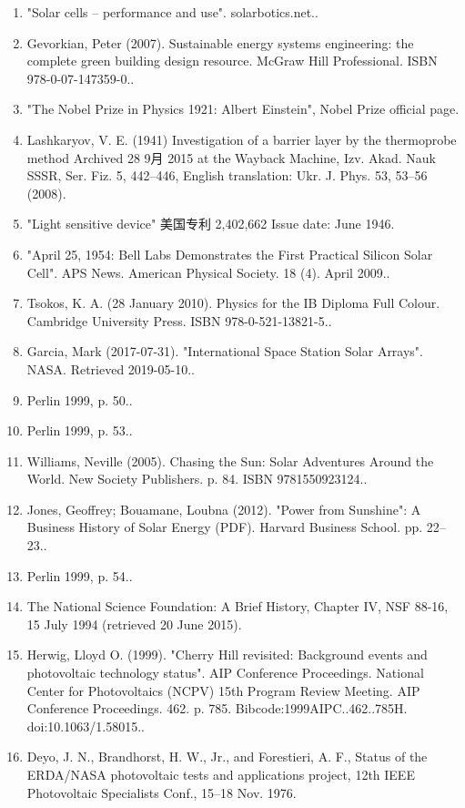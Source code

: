 \begin{enumerate}
\item "Solar cells – performance and use". solarbotics.net..
\item Gevorkian, Peter (2007). Sustainable energy systems engineering: the complete green building design resource. McGraw Hill Professional. ISBN 978-0-07-147359-0..
\item "The Nobel Prize in Physics 1921: Albert Einstein", Nobel Prize official page.
\item Lashkaryov, V. E. (1941) Investigation of a barrier layer by the thermoprobe method Archived 28 9月 2015 at the Wayback Machine, Izv. Akad. Nauk SSSR, Ser. Fiz. 5, 442–446, English translation: Ukr. J. Phys. 53, 53–56 (2008).
\item "Light sensitive device" 美国专利 2,402,662 Issue date: June 1946.
\item "April 25, 1954: Bell Labs Demonstrates the First Practical Silicon Solar Cell". APS News. American Physical Society. 18 (4). April 2009..
\item Tsokos, K. A. (28 January 2010). Physics for the IB Diploma Full Colour. Cambridge University Press. ISBN 978-0-521-13821-5..
\item Garcia, Mark (2017-07-31). "International Space Station Solar Arrays". NASA. Retrieved 2019-05-10..
\item Perlin 1999, p. 50..
\item Perlin 1999, p. 53..
\item Williams, Neville (2005). Chasing the Sun: Solar Adventures Around the World. New Society Publishers. p. 84. ISBN 9781550923124..
\item Jones, Geoffrey; Bouamane, Loubna (2012). "Power from Sunshine": A Business History of Solar Energy (PDF). Harvard Business School. pp. 22–23..
\item Perlin 1999, p. 54..
\item The National Science Foundation: A Brief History, Chapter IV, NSF 88-16, 15 July 1994 (retrieved 20 June 2015).
\item Herwig, Lloyd O. (1999). "Cherry Hill revisited: Background events and photovoltaic technology status". AIP Conference Proceedings. National Center for Photovoltaics (NCPV) 15th Program Review Meeting. AIP Conference Proceedings. 462. p. 785. Bibcode:1999AIPC..462..785H. doi:10.1063/1.58015..
\item Deyo, J. N., Brandhorst, H. W., Jr., and Forestieri, A. F., Status of the ERDA/NASA photovoltaic tests and applications project, 12th IEEE Photovoltaic Specialists Conf., 15–18 Nov. 1976.

\end{enumerate}
